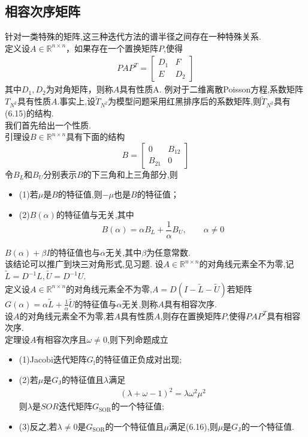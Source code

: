 \documentclass[12pt,a4paper]{article}
\begin{document}
\subsection{\color{blue}相容次序矩阵}
针对一类特殊的矩阵,这三种迭代方法的谱半径之间存在一种特殊关系.\\
{\color{blue}定义}设$A \in \mathbb{R}^{n \times n}$，如果存在一个置换矩阵$P$,使得
\begin{align}
P A P^{T}=\left[\begin{array}{cc}{D_{1}} & {F} \\ {E} & {D_{2}}\end{array}\right]\tag{6.15}
\end{align}
其中$D_{1}, D_{2}$为对角矩阵，则称$A$具有{\color{blue}性质A}.
{\color{blue}例}\quad 对于二维离散Poisson方程,系数矩阵$T_{N^{2}}$具有性质$A$.事实上,设$\tilde{T}_{N^{2}}$为模型问题采用红黑排序后的系数矩阵,则$\tilde{T}_{N^{2}}$具有({\color{blue}6.15})的结构.\\
我们首先给出一个性质.\\
{\color{blue}引理}\quad 设$B \in \mathbb{R}^{n \times n}$具有下面的结构
$$
B=\left[\begin{array}{cc}{0} & {B_{12}} \\ {B_{21}} & {0}\end{array}\right]
$$
令$B_L$和$B_U$分别表示$B$的下三角和上三角部分,则
\begin{itemize}
\item (1)若$\mu$是$B$的特征值,则$-\mu$也是$B$的特征值；
\item (2)$B(\alpha)$的特征值与无关,其中
$$
B(\alpha)=\alpha B_L+\frac{1}{\alpha}B_U,\qquad \alpha \ne 0
$$
\end{itemize}
$B(\alpha)+\beta I$的特征值也与$\alpha$无关,其中$\beta$为任意常数.\\
该结论可以推广到块三对角形式,见习题.
设$A \in \mathbb{R}^{n \times n}$的对角线元素全不为零,记$\tilde{L}=D^{-1} L, \tilde{U}=D^{-1} U$.\\
{\color{blue}定义}设$A \in \mathbb{R}^{n \times n}$的对角线元素全不为零,$A=D(I-\tilde{L}-\tilde{U})$若矩阵$G(\alpha)=\alpha \tilde{L}+\frac{1}{\alpha} \tilde{U}$的特征值与$\alpha$无关,则称$A$具有相容次序.\\
设$A$的对角线元素全不为零,若$A$具有性质$A$,则存在置换矩阵$P$,使得$P A P^{T}$具有相容次序.\\
{\color{blue}定理}\quad 设$A$有相容次序且$\omega \neq 0$,则下列命题成立
\begin{itemize}
\item (1)Jacobi迭代矩阵$G_{\mathrm{l}}$的特征值正负成对出现;
\item (2)若$\mu$是$G_{\mathrm{J}}$的特征值且$\lambda$满足
\begin{align}
(\lambda+\omega-1)^{2}=\lambda \omega^{2} \mu^{2}\tag{6.16}
\end{align}
则$\lambda$是$SOR$迭代矩阵$G_{\mathrm{SOR}}$的一个特征值;
\item (3)反之,若$\lambda \neq 0$是$G_{\mathrm{SOR}}$的一个特征值且$\mu$满足(6.16),则$\mu$是$G_{\mathrm{J}}$的一个特征值.
\end{itemize}
\end{document}
